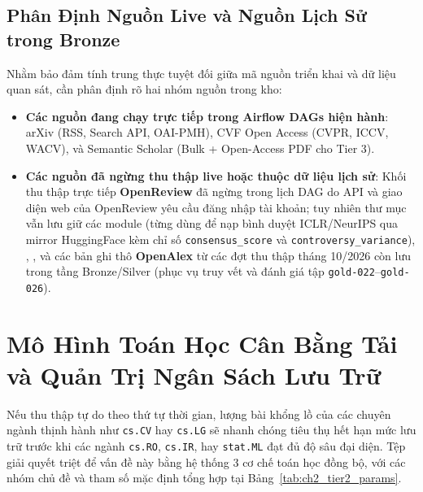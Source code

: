 \subsection{Phân Định Nguồn Live và Nguồn Lịch Sử trong Bronze}
\label{sec:ch2_source_distinction}

Nhằm bảo đảm tính trung thực tuyệt đối giữa mã nguồn triển khai và dữ liệu quan sát, cần phân định rõ hai nhóm nguồn trong kho:
\begin{itemize}
  \item \textbf{Các nguồn đang chạy trực tiếp trong Airflow DAGs hiện hành}: arXiv (RSS, Search API, OAI-PMH), CVF Open Access (CVPR, ICCV, WACV), và Semantic Scholar (Bulk + Open-Access PDF cho Tier 3).
  \item \textbf{Các nguồn đã ngừng thu thập live hoặc thuộc dữ liệu lịch sử}: Khối thu thập trực tiếp \textbf{OpenReview} đã ngừng trong lịch DAG do API và giao diện web của OpenReview yêu cầu đăng nhập tài khoản; tuy nhiên thư mục  vẫn lưu giữ các module  (từng dùng để nạp bình duyệt ICLR/NeurIPS qua mirror HuggingFace kèm chỉ số \texttt{consensus\_score} và \texttt{controversy\_variance}), , ,  và các bản ghi thô \textbf{OpenAlex} từ các đợt thu thập tháng 10/2026 còn lưu trong tầng Bronze/Silver (phục vụ truy vết và đánh giá tập \texttt{gold-022}--\texttt{gold-026}).
\end{itemize}

\section{Mô Hình Toán Học Cân Bằng Tải và Quản Trị Ngân Sách Lưu Trữ}
\label{sec:ch2_waterfilling}

Nếu thu thập tự do theo thứ tự thời gian, lượng bài khổng lồ của các chuyên ngành thịnh hành như \texttt{cs.CV} hay \texttt{cs.LG} sẽ nhanh chóng tiêu thụ hết hạn mức lưu trữ trước khi các ngành \texttt{cs.RO}, \texttt{cs.IR}, hay \texttt{stat.ML} đạt đủ độ sâu đại diện. Tệp  giải quyết triệt để vấn đề này bằng hệ thống 3 cơ chế toán học đồng bộ, với các nhóm chủ đề và tham số mặc định tổng hợp tại Bảng~\ref{tab:ch2_tier2_params}.


